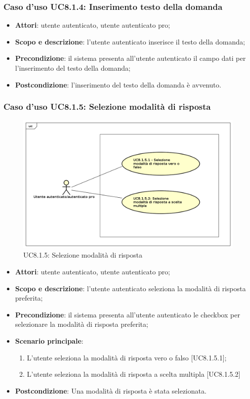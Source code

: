 	\subsubsection{Caso d'uso UC8.1.4: Inserimento testo della domanda}
	\begin{itemize}
		\item
			\textbf{Attori}: utente autenticato, utente autenticato pro;
		\item
			\textbf{Scopo e descrizione}: l'utente autenticato inserisce il testo della domanda;
		\item		
			\textbf{Precondizione}: il sistema presenta all'utente autenticato il campo dati per l'inserimento del testo della domanda;
		\item
			\textbf{Postcondizione}: l'inserimento del testo della domanda è avvenuto.
	\end{itemize}
	\subsubsection{Caso d'uso UC8.1.5: Selezione modalità di risposta}
	\label{UC8.1.5}
	\begin{figure}[h]
		\centering
			\includegraphics[scale=0.5,keepaspectratio]{UML/UC8_1_5.png}
		\caption{UC8.1.5: Selezione modalità di risposta}
	\end{figure}
	\FloatBarrier
	\begin{itemize}
		\item
			\textbf{Attori}: utente autenticato, utente autenticato pro;
		\item
			\textbf{Scopo e descrizione}: l'utente autenticato seleziona la modalità di risposta preferita;
		\item		
			\textbf{Precondizione}: il sistema presenta all'utente autenticato le checkbox per selezionare la modalità di risposta preferita;
		\item
			\textbf{Scenario principale}:
	       		\begin{enumerate}
					\item
					L'utente seleziona la modalità di risposta vero o falso [UC8.1.5.1];
					\item
					L'utente seleziona la modalità di risposta a scelta multipla [UC8.1.5.2]	       		
	       		\end{enumerate}
		\item
			\textbf{Postcondizione}: Una modalità di risposta è stata selezionata.
	\end{itemize}
